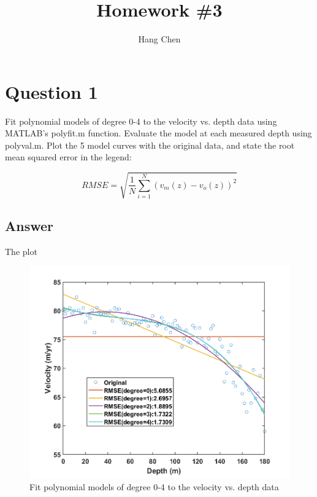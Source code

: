 \documentclass[
	12pt, %
]{fphw}
\title{Homework \#3} %
\author{Hang Chen} %
\institute{Boise State University \\ Department of geoscience} %
\begin{document}
\maketitle %


\section*{Question 1}

\begin{problem}
Fit polynomial models of degree 0-4 to the velocity vs. depth data using MATLAB's polyfit.m function.
Evaluate the model at each measured depth using polyval.m. Plot the 5 model curves with the original
data, and state the root mean squared error in the legend:

	\begin{equation}
	R M S E=\sqrt{\frac{1}{N} \sum_{i=1}^{N}\left(v_{m}(z)-v_{o}(z)\right)^{2}}
	\end{equation}

\end{problem}





\subsection*{Answer}
The plot

\begin{figure}[htbp]
	\centering
	\includegraphics[width=0.8\columnwidth]{Q1.png} 
	\caption{Fit polynomial models of degree 0-4 to the velocity vs. depth data}
\end{figure}
\end{document}
